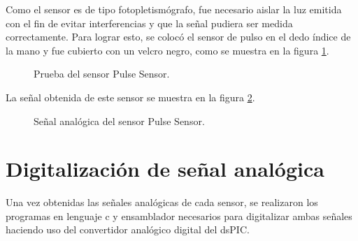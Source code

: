 Como el sensor es de tipo fotopletismógrafo, fue necesario aislar la luz emitida con el fin de evitar interferencias y que la señal pudiera ser medida correctamente. Para lograr esto, se colocó el sensor de pulso en el dedo índice de la mano y fue cubierto con un velcro negro, como se muestra en la figura \ref{fig:PulseSensor1}.\\
	
	\begin{figure}[htbp!]
		\centering
		\caption{Prueba del sensor Pulse Sensor.}
		\label{fig:PulseSensor1}
	\end{figure}

La señal obtenida de este sensor se muestra en la figura \ref{fig:PulseSensor3}.	
	\begin{figure}[htbp!]
		\centering
		\caption{Señal analógica del sensor Pulse Sensor.}
		\label{fig:PulseSensor3}
	\end{figure}

\pagebreak \newpage	
\section{Digitalización de señal analógica}
Una vez obtenidas las señales analógicas de cada sensor, se realizaron los programas en lenguaje c y ensamblador necesarios para digitalizar ambas señales haciendo uso del convertidor analógico digital del dsPIC.\\

